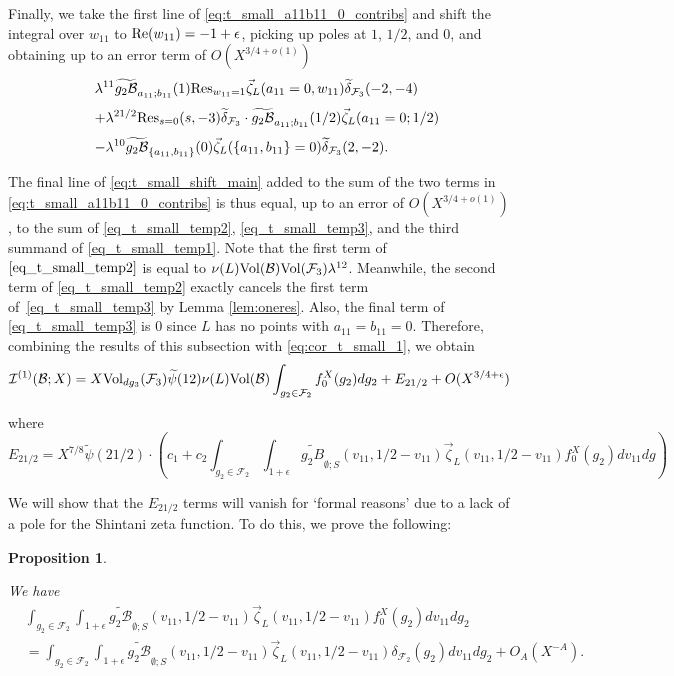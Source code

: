 \documentclass{article}
\def\Res{{\rm Res}}
\def\Re{{\rm Re}}
\def\Vol{{\rm Vol}}
\def\cB{{\mathcal B}}
\def\FF{{\mathcal F}}
\def\I{{\mathcal I}}
\def\wt{\widetilde}
\newtheorem{proposition}[theorem]{Proposition}
\begin{document}
Finally, we take the first line of \eqref{eq:t_small_a11b11_0_contribs} and shift the integral over $w_{11}$ to $\Re(w_{11})=-1+\epsilon$, picking up poles at $1$, $1/2$, and $0$, and obtaining up to an error term of $O(X^{3/4+o(1)})$
\begin{equation}\label{eq_t_small_temp3}
\begin{array}{ll}
&\displaystyle
\lambda^{11}\wt{g_2\cB}_{a_{11};b_{11}}(1)\Res_{w_{11}=1}\vec{\zeta}_L(a_{11}=0,w_{11})\wt{\delta}_{\FF_3}(-2,-4)
\\[.1in]&\displaystyle
+\lambda^{21/2}\Res_{s=0}(s,-3)\wt{\delta}_{\FF_3}\cdot\wt{g_2\cB}_{a_{11};b_{11}}(1/2)\vec{\zeta}_L(a_{11}=0;1/2)
\\[.1in]&\displaystyle
-\lambda^{10}\wt{g_2\cB}_{\{a_{11},b_{11}\}}(0)\vec{\zeta}_L(\{a_{11},b_{11}\}=0)\wt{\delta}_{\FF_3}(2,-2).
\end{array}
\end{equation}

The final line of \eqref{eq:t_small_shift_main} added to the sum of the two terms in \eqref{eq:t_small_a11b11_0_contribs} is thus equal, up to an error of $O(X^{3/4+o(1)})$, to the sum of \eqref{eq_t_small_temp2}, \eqref{eq_t_small_temp3}, and the third summand of \eqref{eq_t_small_temp1}.
Note that the first term of $\eqref{eq_t_small_temp2}$ is equal to $\nu(L)\Vol(\cB)\Vol(\FF_3)\lambda^{12}$. Meanwhile, the second term of \eqref{eq_t_small_temp2} exactly cancels the first term of~\eqref{eq_t_small_temp3} by Lemma \ref{lem:oneres}. Also, the final term of \eqref{eq_t_small_temp3} is $0$ since $L$ has no points with $a_{11}=b_{11}=0$. Therefore, combining the results of this subsection with \eqref{eq:cor_t_small_1}, we obtain
\begin{equation}\label{eq:I1uptoerror}
\I^{(1)}(\cB;X)=X\Vol_{dg_3}(\FF_3)\wt{\psi}(12)\nu(L)\Vol(\cB)\int_{g_2\in\FF_2}f_0^X(g_2)dg_2 + E_{21/2} +O(X^{3/4+\epsilon})
\end{equation}

where 
$$E_{21/2}=X^{7/8}\wt{\psi}(21/2)\cdot \left(c_1+c_2\int_{g_2\in\FF_2}\int_{1+\epsilon}\widetilde{g_2B}_{\emptyset;S}(v_{11},1/2-v_{11})\vec{\zeta}_L(v_{11},1/2-v_{11})f_0^X(g_2)dv_{11}dg\right)$$

We will show that the $E_{21/2}$ terms will vanish for `formal reasons' due to a lack of a pole for the Shintani zeta function. To do this, we prove the following:

\begin{proposition}\label{prop:formalpowerexpansion}

We have \begin{align*}
&\int_{g_2\in\FF_2}\int_{1+\epsilon}\widetilde{g_2\cB}_{\emptyset;S}(v_{11},1/2-v_{11})\vec{\zeta}_L(v_{11},1/2-v_{11})f_0^X(g_2)dv_{11}dg_2\\ &= \int_{g_2\in\FF_2}\int_{1+\epsilon}\widetilde{g_2\cB}_{\emptyset;S}(v_{11},1/2-v_{11})\vec{\zeta}_L(v_{11},1/2-v_{11})\delta_{\FF_2}(g_2)dv_{11}dg_2 +O_A(X^{-A}).\\
\end{align*}    
\end{proposition}
\end{document}
